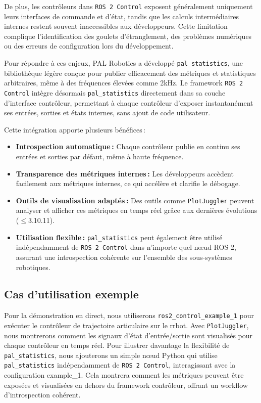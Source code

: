 \documentclass[11pt,a4paper]{article}
\begin{document}
De plus, les contrôleurs dans \texttt{ROS 2 Control} exposent généralement
uniquement leurs interfaces de commande et d'état, tandis que les calculs
intermédiaires internes restent souvent inaccessibles aux développeurs. Cette
limitation complique l'identification des goulets d'étranglement, des problèmes
numériques ou des erreurs de configuration lors du développement.

Pour répondre à ces enjeux, PAL Robotics a développé \texttt{pal\_statistics},
une bibliothèque légère conçue pour publier efficacement des métriques et
statistiques arbitraires, même à des fréquences élevées comme 2kHz. Le framework
\texttt{ROS 2 Control} intègre désormais \texttt{pal\_statistics} directement
dans sa couche d'interface contrôleur, permettant à chaque contrôleur d'exposer
instantanément ses entrées, sorties et états internes, sans ajout de code
utilisateur.

Cette intégration apporte plusieurs bénéfices :
\begin{itemize}
  \item \textbf{Introspection automatique :} Chaque contrôleur publie en continu
        ses entrées et sorties par défaut, même à haute fréquence.
  \item \textbf{Transparence des métriques internes :} Les développeurs accèdent
        facilement aux métriques internes, ce qui accélère et clarifie le
        débogage.
  \item \textbf{Outils de visualisation adaptés :} Des outils comme
        \texttt{PlotJuggler} peuvent analyser et afficher ces métriques en temps
        réel grâce aux dernières évolutions ($\leq$3.10.11).
  \item \textbf{Utilisation flexible :} \texttt{pal\_statistics} peut également
        être utilisé indépendamment de \texttt{ROS 2 Control} dans n'importe
        quel nœud ROS 2, assurant une introspection cohérente sur l'ensemble des
        sous-systèmes robotiques.
\end{itemize}

\subsection*{Cas d'utilisation exemple}

Pour la démonstration en direct, nous utiliserons
\texttt{ros2\_control\_example\_1} pour exécuter le contrôleur de trajectoire
articulaire sur le rrbot. Avec \texttt{PlotJuggler}, nous montrerons comment les
signaux d'état d'entrée/sortie sont visualisés pour chaque contrôleur en temps
réel. Pour illustrer davantage la flexibilité de \texttt{pal\_statistics}, nous
ajouterons un simple nœud Python qui utilise \texttt{pal\_statistics}
indépendamment de \texttt{ROS 2 Control}, interagissant avec la configuration
example\_1. Cela montrera comment les métriques peuvent être exposées et
visualisées en dehors du framework contrôleur, offrant un workflow
d'introspection cohérent.
\end{document}
